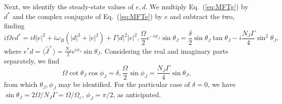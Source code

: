 \documentclass[11pt]{article}
\begin{document}
Next, we identify the steady-state values of $e, d$. We multiply Eq.~(\ref{eq:MFTg}) by $d^*$ and the complex conjugate of Eq.~(\ref{eq:MFTe}) by $e$ and subtract the two, finding
\begin{subequations}
    \begin{equation}
        i \Omega e d^* = i \delta |e|^2 + i \omega_B(|d|^2 + |e|^2) + \Gamma |d|^2 |e|^2,
    \end{equation}
    \begin{equation}
        \frac{\Omega}{2}  e^{-i \phi_J} \sin \theta_J=  \frac{\delta}{2} \sin \theta_J\tan \theta_J - i \frac{N_J \Gamma}{4} \sin^2 \theta_J,
    \end{equation}
\end{subequations}
where $e^* d = \langle \hat J^+ \rangle = \frac{N_J}{2} e^{i \phi_J} \sin \theta_J$.
Considering the real and imaginary parts separately, we find
\begin{subequations}
    \begin{equation}
        \Omega \cot \theta_J\cos \phi_J = \delta,
    \end{equation}
    \begin{equation}
        \frac{\Omega}{2} \sin \phi_J = \frac{N_J \Gamma}{4} \sin \theta_J,
    \end{equation}
\end{subequations}
from which $\theta_J, \phi_J$ may be identified. For the particular case of $\delta = 0$, we have $\sin \theta_J= 2 \Omega/N_J \Gamma = \Omega/\Omega_c$, $\phi_J = \pi/2$, as anticipated.
\end{document}
